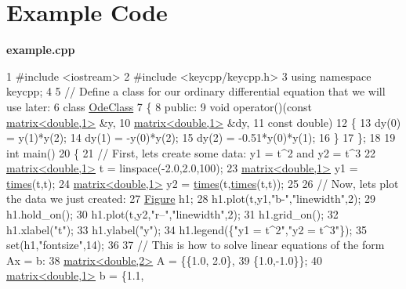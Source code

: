 \section*{\label{_example}%
Example Code}

{\bfseries {\ttfamily example.\-cpp}} 
\begin{DoxyCodeInclude}
1 \textcolor{preprocessor}{#include <iostream>}
2 \textcolor{preprocessor}{#include <keycpp/keycpp.h>}
3 \textcolor{keyword}{using namespace }keycpp;
4 
5 \textcolor{comment}{// Define a class for our ordinary differential equation that we will use later:}
6 \textcolor{keyword}{class }\hyperlink{class_ode_class}{OdeClass}
7 \{
8     \textcolor{keyword}{public}:
9         \textcolor{keywordtype}{void} operator()(\textcolor{keyword}{const} \hyperlink{classkeycpp_1_1matrix}{matrix<double,1>} &y,
10                         \hyperlink{classkeycpp_1_1matrix}{matrix<double,1>} &dy,
11                         \textcolor{keyword}{const} \textcolor{keywordtype}{double})
12         \{
13             dy(0) = y(1)*y(2);
14             dy(1) = -y(0)*y(2);
15             dy(2) = -0.51*y(0)*y(1);
16         \}
17 \};
18 
19 \textcolor{keywordtype}{int} main()
20 \{
21     \textcolor{comment}{// First, lets create some data: y1 = t^2 and y2 = t^3}
22     \hyperlink{classkeycpp_1_1matrix}{matrix<double,1>} t = linspace(-2.0,2.0,100);
23     \hyperlink{classkeycpp_1_1matrix}{matrix<double,1>} y1 = \hyperlink{namespacekeycpp_a23a0fd48168263aad7f77f1769dc2f2a}{times}(t,t);
24     \hyperlink{classkeycpp_1_1matrix}{matrix<double,1>} y2 = \hyperlink{namespacekeycpp_a23a0fd48168263aad7f77f1769dc2f2a}{times}(t,\hyperlink{namespacekeycpp_a23a0fd48168263aad7f77f1769dc2f2a}{times}(t,t));
25 
26     \textcolor{comment}{// Now, lets plot the data we just created:}
27     \hyperlink{classkeycpp_1_1_figure}{Figure} h1;
28     h1.plot(t,y1,\textcolor{stringliteral}{"b-"},\textcolor{stringliteral}{"linewidth"},2);
29     h1.hold\_on();
30     h1.plot(t,y2,\textcolor{stringliteral}{"r--"},\textcolor{stringliteral}{"linewidth"},2);
31     h1.grid\_on();
32     h1.xlabel(\textcolor{stringliteral}{"t"});
33     h1.ylabel(\textcolor{stringliteral}{"y"});
34     h1.legend(\{\textcolor{stringliteral}{"y1 = t^2"},\textcolor{stringliteral}{"y2 = t^3"}\});
35     set(h1,\textcolor{stringliteral}{"fontsize"},14);
36 
37     \textcolor{comment}{// This is how to solve linear equations of the form Ax = b:}
38     \hyperlink{classkeycpp_1_1matrix}{matrix<double,2>} A = \{\{1.0, 2.0\},
39                           \{1.0,-1.0\}\};
40     \hyperlink{classkeycpp_1_1matrix}{matrix<double,1>} b = \{1.1,

\end{DoxyCodeInclude}
